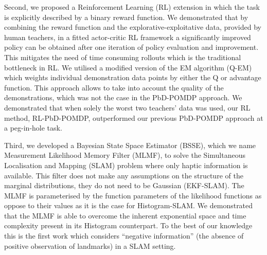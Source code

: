 Second, we proposed a Reinforcement Learning (RL) extension in which the task is explicitly described by a binary reward 
function. We demonstrated that by combining the reward function and the explorative-exploitative data, provided by human teachers, in 
a fitted actor-critic RL framework a significantly improved policy can be obtained after one iteration of policy evaluation
and improvement. This mitigates the need of time consuming rollouts which is the traditional bottleneck in RL.
We utilised a modified version of the EM algorithm (Q-EM) which weights individual demonstration data points by 
either the Q or advantage function. This approach allows to take into account the quality of the demonstrations, which was not the case 
in the PbD-POMDP approach. We demonstrated that when solely the worst two teachers' data was used, our RL method, RL-PbD-POMDP,
outperformed our previous PbD-POMDP approach at a peg-in-hole task. 



Third, we developed a Bayesian State Space Estimator (BSSE), which we name Measurement Likelihood Memory Filter (MLMF), to solve 
the Simultaneous Localisation and Mapping (SLAM) problem where only haptic information is available.
This filter does not make any assumptions on the structure of the marginal distributions, they do not need to be Gaussian (EKF-SLAM). 
The MLMF is parameterised by the function parameters of the likelihood functions as oppose
to their values as it is the case for Histogram-SLAM. We demonstrated that the MLMF  is able to overcome the inherent exponential space and 
time complexity present in its Histogram counterpart. To the best of our knowledge this is the first 
work which considers ``negative information'' (the absence of positive observation of landmarks) in a SLAM setting.


